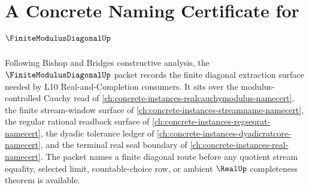\chapter{A Concrete Naming Certificate for $\FiniteModulusDiagonalUp$}
\label{ch:concrete-instances-finite-modulus-diagonal-namecert}

Following Bishop and Bridges constructive analysis, the $\FiniteModulusDiagonalUp$ packet records the finite diagonal extraction surface needed by L10 Real-and-Completion consumers. It sits over the modulus-controlled Cauchy read of \autoref{ch:concrete-instances-realcauchymodulus-namecert}, the finite stream-window surface of \autoref{ch:concrete-instances-streamname-namecert}, the regular rational readback surface of \autoref{ch:concrete-instances-regseqrat-namecert}, the dyadic tolerance ledger of \autoref{ch:concrete-instances-dyadicratcore-namecert}, and the terminal real seal boundary of \autoref{ch:concrete-instances-real-namecert}. The packet names a finite diagonal route before any quotient stream equality, selected limit, countable-choice row, or ambient $\RealUp$ completeness theorem is available.

